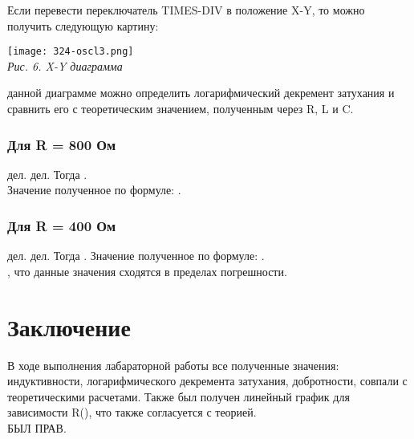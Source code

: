 Если перевести переключатель TIMES-DIV в положение X-Y, то можно получить следующую картину:

\begin{center}

    \texttt{[image: 324-oscl3.png]} \\
    \textit{Рис. 6. X-Y диаграмма}

\end{center}

 данной диаграмме можно определить логарифмический декремент затухания и сравнить его с теоретическим значением, полученным через R, L и C.

\newpage

\subsubsection{Для R = 800 Ом}
 дел.  дел. Тогда . \\ [0.2cm]
Значение полученное по формуле: .

\subsubsection{Для R = 400 Ом}
 дел.  дел. Тогда .
Значение полученное по формуле: . \\ [0.2cm]

, что данные значения сходятся в пределах погрешности.

\section{Заключение}

В ходе выполнения лабараторной работы все полученные значения: индуктивности, логарифмического декремента затухания, добротности, совпали с теоретическими расчетами. Также был получен линейный график для зависимости R(\mth{\Theta}), что также согласуется с теорией. \\ [0.3cm]

 БЫЛ ПРАВ.